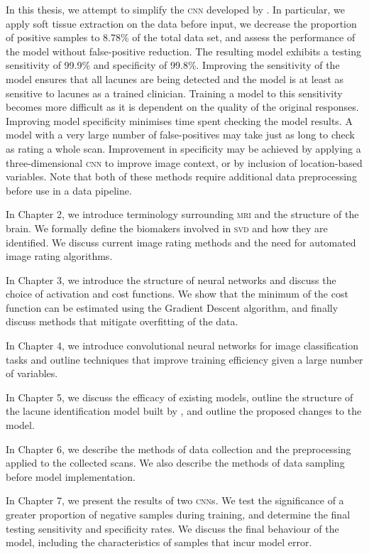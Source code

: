 In this thesis, we attempt to simplify the \textsc{cnn} developed by \cite{GhafoorianM.2017Dml3}. In particular, we apply soft tissue extraction on the data before input, we decrease the proportion of positive samples to 8.78\% of the total data set, and assess the performance of the model without false-positive reduction. The resulting model exhibits a testing sensitivity of 99.9\% and specificity of 99.8\%. Improving the sensitivity of the model ensures that all lacunes are being detected and the model is at least as sensitive to lacunes as a trained clinician. Training a model to this sensitivity becomes more difficult as it is dependent on the quality of the original responses. Improving model specificity minimises time spent checking the model results. A model with a very large number of false-positives may take just as long to check as rating a whole scan. Improvement in specificity may be achieved by applying a three-dimensional \textsc{cnn} to improve image context, or by inclusion of location-based variables. Note that both of these methods require additional data preprocessing before use in a data pipeline.

In Chapter 2, we introduce terminology surrounding \textsc{mri} and the structure of the brain. We formally define the biomakers involved in \textsc{svd} and how they are identified. We discuss current image rating methods and the need for automated image rating algorithms.

In Chapter 3, we introduce the structure of neural networks and discuss the choice of activation and cost functions. We show that the minimum of the cost function can be estimated using the Gradient Descent algorithm, and finally discuss methods that mitigate overfitting of the data.

In Chapter 4, we introduce convolutional neural networks for image classification tasks and outline techniques that improve training efficiency given a large number of variables.

In Chapter 5, we discuss the efficacy of existing models, outline the structure of the lacune identification model built by \cite{GhafoorianM.2017Dml3}, and outline the proposed changes to the model.

In Chapter 6, we describe the methods of data collection and the preprocessing applied to the collected scans. We also describe the methods of data sampling before model implementation.

In Chapter 7, we present the results of two \textsc{cnn}s. We test the significance of a greater proportion of negative samples during training, and determine the final testing sensitivity and specificity rates. We discuss the final behaviour of the model, including the characteristics of samples that incur model error.

%
%
%





%
